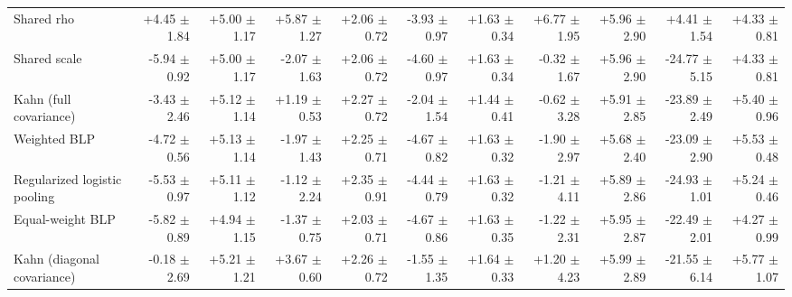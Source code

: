 \begin{tabular}{lrrrrrrrrrr}
Shared rho & +4.45 {\scriptsize $\pm$ 1.84} & +5.00 {\scriptsize $\pm$ 1.17} & +5.87 {\scriptsize $\pm$ 1.27} & +2.06 {\scriptsize $\pm$ 0.72} & -3.93 {\scriptsize $\pm$ 0.97} & +1.63 {\scriptsize $\pm$ 0.34} & +6.77 {\scriptsize $\pm$ 1.95} & +5.96 {\scriptsize $\pm$ 2.90} & +4.41 {\scriptsize $\pm$ 1.54} & +4.33 {\scriptsize $\pm$ 0.81} \\
Shared scale & -5.94 {\scriptsize $\pm$ 0.92} & +5.00 {\scriptsize $\pm$ 1.17} & -2.07 {\scriptsize $\pm$ 1.63} & +2.06 {\scriptsize $\pm$ 0.72} & -4.60 {\scriptsize $\pm$ 0.97} & +1.63 {\scriptsize $\pm$ 0.34} & -0.32 {\scriptsize $\pm$ 1.67} & +5.96 {\scriptsize $\pm$ 2.90} & -24.77 {\scriptsize $\pm$ 5.15} & +4.33 {\scriptsize $\pm$ 0.81} \\
Kahn (full covariance) & -3.43 {\scriptsize $\pm$ 2.46} & +5.12 {\scriptsize $\pm$ 1.14} & +1.19 {\scriptsize $\pm$ 0.53} & +2.27 {\scriptsize $\pm$ 0.72} & -2.04 {\scriptsize $\pm$ 1.54} & +1.44 {\scriptsize $\pm$ 0.41} & -0.62 {\scriptsize $\pm$ 3.28} & +5.91 {\scriptsize $\pm$ 2.85} & -23.89 {\scriptsize $\pm$ 2.49} & +5.40 {\scriptsize $\pm$ 0.96} \\
Weighted BLP & -4.72 {\scriptsize $\pm$ 0.56} & +5.13 {\scriptsize $\pm$ 1.14} & -1.97 {\scriptsize $\pm$ 1.43} & +2.25 {\scriptsize $\pm$ 0.71} & -4.67 {\scriptsize $\pm$ 0.82} & +1.63 {\scriptsize $\pm$ 0.32} & -1.90 {\scriptsize $\pm$ 2.97} & +5.68 {\scriptsize $\pm$ 2.40} & -23.09 {\scriptsize $\pm$ 2.90} & +5.53 {\scriptsize $\pm$ 0.48} \\
Regularized logistic pooling & -5.53 {\scriptsize $\pm$ 0.97} & +5.11 {\scriptsize $\pm$ 1.12} & -1.12 {\scriptsize $\pm$ 2.24} & +2.35 {\scriptsize $\pm$ 0.91} & -4.44 {\scriptsize $\pm$ 0.79} & +1.63 {\scriptsize $\pm$ 0.32} & -1.21 {\scriptsize $\pm$ 4.11} & +5.89 {\scriptsize $\pm$ 2.86} & -24.93 {\scriptsize $\pm$ 1.01} & +5.24 {\scriptsize $\pm$ 0.46} \\
Equal-weight BLP & -5.82 {\scriptsize $\pm$ 0.89} & +4.94 {\scriptsize $\pm$ 1.15} & -1.37 {\scriptsize $\pm$ 0.75} & +2.03 {\scriptsize $\pm$ 0.71} & -4.67 {\scriptsize $\pm$ 0.86} & +1.63 {\scriptsize $\pm$ 0.35} & -1.22 {\scriptsize $\pm$ 2.31} & +5.95 {\scriptsize $\pm$ 2.87} & -22.49 {\scriptsize $\pm$ 2.01} & +4.27 {\scriptsize $\pm$ 0.99} \\
Kahn (diagonal covariance) & -0.18 {\scriptsize $\pm$ 2.69} & +5.21 {\scriptsize $\pm$ 1.21} & +3.67 {\scriptsize $\pm$ 0.60} & +2.26 {\scriptsize $\pm$ 0.72} & -1.55 {\scriptsize $\pm$ 1.35} & +1.64 {\scriptsize $\pm$ 0.33} & +1.20 {\scriptsize $\pm$ 4.23} & +5.99 {\scriptsize $\pm$ 2.89} & -21.55 {\scriptsize $\pm$ 6.14} & +5.77 {\scriptsize $\pm$ 1.07} \\

\end{tabular}
